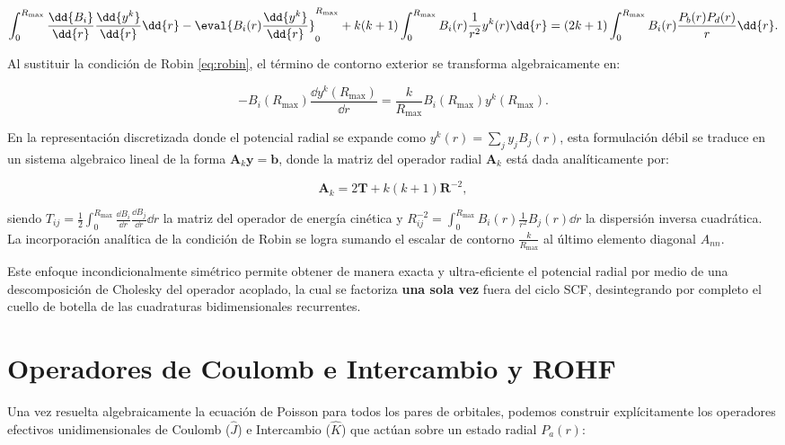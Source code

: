 \begin{equation}
  \int_0^{R_{\text{max}}} \frac{\dd{B_i}}{\dd{r}} \frac{\dd{y^k}}{\dd{r}} \dd{r} - \eval{ B_i(r) \frac{\dd{y^k}}{\dd{r}} }_0^{R_{\text{max}}} + k(k+1) \int_0^{R_{\text{max}}} B_i(r) \frac{1}{r^2} y^k(r) \dd{r} = (2k+1) \int_0^{R_{\text{max}}} B_i(r) \frac{P_b(r) P_d(r)}{r} \dd{r}.
\end{equation}

Al sustituir la condición de Robin \eqref{eq:robin}, el término de contorno exterior se transforma algebraicamente en:

\begin{equation}
  - B_i(R_{\text{max}}) \frac{\dd{y^k(R_{\text{max}})}}{\dd{r}} = \frac{k}{R_{\text{max}}} B_i(R_{\text{max}}) y^k(R_{\text{max}}).
\end{equation}

En la representación discretizada donde el potencial radial se expande como \( y^k(r) = \sum_j y_j B_j(r) \), esta formulación débil se traduce en un sistema algebraico lineal de la forma \( \bm{A}_k \bm{y} = \bm{b} \), donde la matriz del operador radial \( \bm{A}_k \) está dada analíticamente por:

\begin{equation}
  \bm{A}_k = 2 \bm{T} + k(k+1) \bm{R}^{-2},
\end{equation}

siendo \( T_{ij} = \frac{1}{2} \int_0^{R_{\text{max}}} \frac{\dd{B_i}}{\dd{r}} \frac{\dd{B_j}}{\dd{r}} \dd{r} \) la matriz del operador de energía cinética y \( R^{-2}_{ij} = \int_0^{R_{\text{max}}} B_i(r) \frac{1}{r^2} B_j(r) \dd{r} \) la dispersión inversa cuadrática. La incorporación analítica de la condición de Robin se logra sumando el escalar de contorno \( \frac{k}{R_{\text{max}}} \) al último elemento diagonal \( A_{nn} \). 

Este enfoque incondicionalmente simétrico permite obtener de manera exacta y ultra-eficiente el potencial radial por medio de una descomposición de Cholesky del operador acoplado, la cual se factoriza \textbf{una sola vez} fuera del ciclo SCF, desintegrando por completo el cuello de botella de las cuadraturas bidimensionales recurrentes.

\section{Operadores de Coulomb e Intercambio y ROHF}

Una vez resuelta algebraicamente la ecuación de Poisson para todos los pares de orbitales, podemos construir explícitamente los operadores efectivos unidimensionales de Coulomb (\( \hat{J} \)) e Intercambio (\( \hat{K} \)) que actúan sobre un estado radial \( P_a(r) \):

